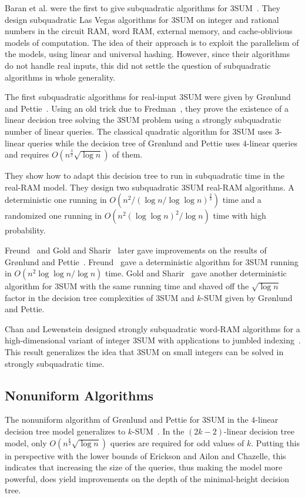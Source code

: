 Baran et al. were the first to give subquadratic algorithms for
3SUM~\cite{BDP08}. They design subquadratic Las Vegas
algorithms for 3SUM on integer and
rational numbers in the circuit RAM, word RAM, external memory, and
cache-oblivious models of computation. The idea of their approach is to exploit
the parallelism of the models, using linear and universal hashing. However,
since their algorithms do not handle real inputs,
this did not settle the question of subquadratic algorithms in whole
generality.

The first subquadratic algorithms for real-input 3SUM were given by
Gr{\o}nlund and Pettie~\cite{GP18}.
Using an old trick due to Fredman~\cite{Fr76},
they prove the existence of a linear decision tree
solving the 3SUM problem using a strongly subquadratic number of linear queries.
The classical quadratic algorithm for 3SUM uses \(3\)-linear queries
while the decision tree of Gr{\o}nlund and Pettie uses \(4\)-linear queries and
requires $O(n^{\frac{3}{2}} \sqrt{\log n})$ of them.


They show how to adapt this decision tree to run in subquadratic time in the
real-RAM model. They design two subquadratic 3SUM
real-RAM algorithms. A deterministic one running in
$O(n^2/{(\log n/\log \log n)}^{\frac{2}{3}})$
time and a randomized one running in
$O(n^2 {(\log \log n)}^2 / \log n)$ time with high probability.

Freund~\cite{Fr15} and Gold and Sharir~\cite{GS15} later gave improvements on the
results of Gr{\o}nlund and Pettie~\cite{GP18}. Freund~\cite{Fr15} gave a deterministic algorithm for
3SUM running in \(O( {n^2\log \log n}/{\log n})\) time.
Gold and Sharir~\cite{GS15} gave another deterministic algorithm for 3SUM
with the same running time and shaved off the $\sqrt{\log n}$ factor in the
decision tree complexities of 3SUM and \(k\)-SUM given by Gr{\o}nlund and Pettie.


Chan and Lewenstein designed strongly subquadratic word-RAM algorithms for a
high-dimensional variant of integer 3SUM with applications to jumbled
indexing~\cite{CL15}. This result generalizes the idea that 3SUM on small
integers can be solved in strongly subquadratic time.

\subsection{Nonuniform Algorithms}

The nonuniform algorithm of Gr\o nlund and
Pettie for 3SUM in the \(4\)-linear decision tree model
generalizes to \(k\)-SUM~\cite{GP18}.
In the $(2k-2)$-linear decision tree model,
only $O(n^\frac{k}{2}\sqrt{\log n})$ queries are required for odd values of $k$.
Putting this in perspective with the lower bounds of Erickson and Ailon and
Chazelle, this indicates that increasing the size of the queries, thus making
the model more powerful, does yield
improvements on the depth of the minimal-height decision tree.

